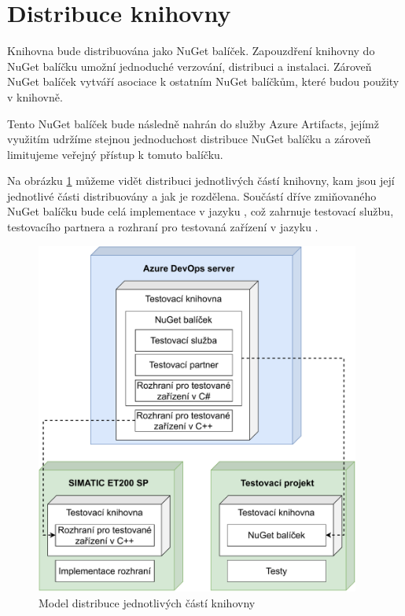 \section{Distribuce knihovny}

Knihovna bude distribuována jako NuGet balíček. Zapouzdření knihovny do NuGet balíčku umožní jednoduché verzování, distribuci a instalaci. Zároveň NuGet balíček vytváří asociace k ostatním NuGet balíčkům, které budou použity v knihovně.

Tento NuGet balíček bude následně nahrán do služby Azure Artifacts, jejímž využitím udržíme stejnou jednoduchost distribuce NuGet balíčku a zároveň limitujeme veřejný přístup k tomuto balíčku. 

Na obrázku \ref{fig:deploymodel} můžeme vidět distribuci jednotlivých částí knihovny, kam jsou její jednotlivé části distribuovány a jak je rozdělena. Součástí dříve zmiňovaného NuGet balíčku bude celá implementace v jazyku \csharp{}, což zahrnuje testovací službu, testovacího partnera a rozhraní pro testovaná zařízení v jazyku \csharp{}. 

\begin{figure}[p!]
    \centering 
    \includegraphics[width=0.95\textwidth]{assets/img/deploymentmodel.pdf}
    \caption{Model distribuce jednotlivých částí knihovny}
    \label{fig:deploymodel}
\end{figure}

